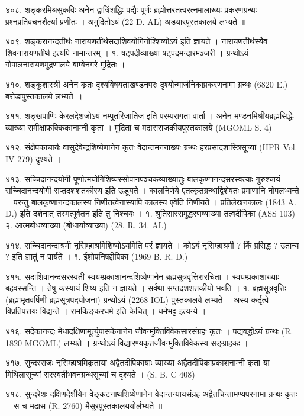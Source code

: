 ४०८. शङ्करमिश्रसुकविः
अनेन द्वात्रिंशद्धिः पद्यैः पूर्णः ब्रह्मोत्तरतत्वरत्नमालाख्यः प्रकरणग्रन्थः प्रश्नप्रतिवचनशैल्यां प्रणीतः । अमुद्रितोऽयं  (22 D. AL) अडयारपुस्तकालये लभ्यते ॥

४०९. शङ्करानन्दतीर्थः
नारायणतीर्थसदाशिवयोगिनोश्शिष्योऽयं इति ज्ञायते । नारायणतीर्थस्यैव शिवनारायणतीर्थ इत्यपि नामान्तरम् ।
१. षट्पदीव्याख्या षट्पदमन्दारमञ्जरी । ग्रन्थोऽयं गोपालनारायणमुद्रणालये बाम्बेनगरे मुद्रितः ।

४१०. शङ्कुशास्त्री
अनेन कृतः दृश्यविषयताखण्डनपरः दृश्योन्मार्जनिकाप्रकरणनामा ग्रन्थः (6820 E.) बरोडापुस्तकालये लभ्यते ॥

४११. शङ्खपाणिः
केरलदेशजोऽयं नम्पूतरिजातिज इति परम्परागता वार्ता । अनेन मण्डनमिश्रीयब्रह्मसिद्धेः व्याख्या समीक्षाफक्किकानाम्नी कृता । मुद्रिता च मद्रासराजकीयपुस्तकालये (MGOML S. 4)

४१२. संक्षेपकाचार्यः
वासुदेवेन्द्रशिष्येणानेन कृतः वेदान्तमननाख्यः ग्रन्थः हरप्रसादशास्त्रिसूच्यां (HPR Vol. IV 279) दृश्यते ।

४१३. सच्चिदानन्दयोगी 
पूर्णात्मयोगिशिष्यस्सोपानपञ्चकव्याख्यातुः बालकृष्णानन्दसरस्वत्याः गुरुश्चायं सच्चिदानन्दयोगी सप्तदशशतकीस्य इति ऊहूयते । कालनिर्णये एतत्कृतग्रन्थाद्विशेषतः प्रमाणानि नोपलभ्यन्ते । परन्तु बालकृष्णानन्दकालस्य निर्णीतत्वेनास्यापि कालस्य एवेति निर्णीयते । प्रतिलेखनकालः (1843 A. D.) इति दर्शनात् तस्मत्पूर्वतन इति तु निश्चयः ।
१. श्रुतिसारसमुद्धरणव्याख्या तत्वदीपिका (ASS 103)
२. आत्मबोधव्याख्या (बोधार्याव्याख्या) (28. R. 34. AL)

४१४. सच्चिदानन्दाश्रमी
नृसिम्हाश्रमिशिष्योऽयमिति परं ज्ञायते । कोऽयं नृसिम्हाश्रमी ? किं प्रसिद्ध ? उतान्य ? इति ज्ञातुं न पार्यते ।
१. ईशोपनिषद्दीपिका (1969 B. R. D.)

४१५. सदाशिवानन्दसरस्वती
स्वयम्प्रकाशानन्दशिष्येणानेन ब्रह्मसूत्रवृत्तिरारचिता । स्वयम्प्रकाशाख्याः बहवस्सन्ति । तेषु कस्यायं शिष्य इति न ज्ञायते । सर्वथा सप्तदशशतकीयो भवति ।
१. ब्रह्मसूत्रवृत्तिः (ब्रह्मामृतवर्षिणी ब्रह्मसूत्रपदयोजना) ग्रन्थोऽयं (2268 IOL) पुस्तकालये लभ्यते । अस्य कर्तृत्वे विप्रतिपत्तयः विद्यन्ते । रामकिङ्करधर्म इति केचित् । धर्मभट्ट इत्यन्ये ।

४१६. सदेकानन्दः
मेधादक्षिणामूर्त्युपासकेनानेन जीवन्मुक्तिविवेकसारसंग्रहः कृतः । पद्यवद्धोऽयं ग्रन्थः (R. 1820 MGOML) लभ्यते । ग्रन्थोऽयं विद्यारण्यकृतजीवन्मुक्तिविवेकस्य सङ्ग्राहकः ।

४१७. सुन्दरराजः
नृसिम्हाश्रमिकृताया अद्वैतदीपिकायाः व्याख्या अद्वैतदीपिकाप्रकाशनाम्नी कृता या मिथिलासूच्यां सरस्वतीभवनग्रन्थसूच्यां च दृश्यते । (S. B. C 408)

४१८. सुन्दरेशः
दक्षिणदेशीयेन वेङ्कटनाथशिष्येणानेन वेदान्तन्यायसंग्रह अद्वैतचिन्तामण्यपरनामा ग्रन्थः कृतः । स च मद्रास (R. 2760) मैसूरपुस्तकालययोर्लभ्यते ॥

